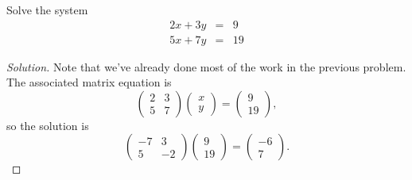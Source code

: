 \documentclass[12pt]{amsart}
\begin{document}
\begin{thm}[20 Points]\label{ex2}
  Solve the system
  \begin{eqnarray*}
    2x + 3y &=& 9\\
    5x + 7y &=& 19
  \end{eqnarray*}
  \begin{proof}[Solution]
    Note that we've already done most of the work in the previous problem.
    The associated matrix equation is 
          $$\left(\begin{array}{cc}
        2 & 3\\
        5 & 7
      \end{array}
      \right)
      \left(\begin{array}{c}
        x\\
        y
      \end{array}
      \right)
      =
      \left(\begin{array}{c}
        9\\
        19
      \end{array}
      \right),$$
      so the solution is
      $$\left(\begin{array}{ccc}
            -7 & 3\\
            5 & -2
        \end{array}
      \right)
      \left(\begin{array}{c}
        9\\
        19
      \end{array}
      \right) 
      = 
      \left(\begin{array}{c}
        -6\\
        7
      \end{array}
      \right).$$
      
  \end{proof}
\end{thm}

\newpage
\end{document}
